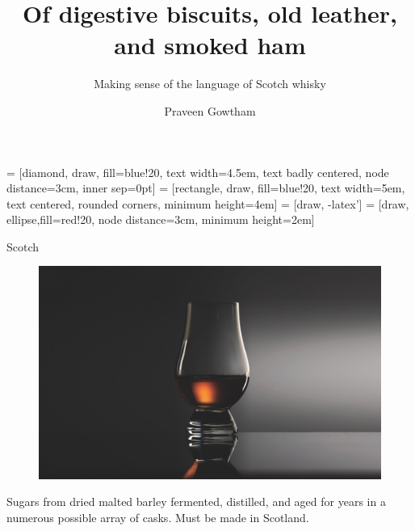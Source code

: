 \documentclass{beamer}
\title[Springboard Capstone 3]{Of digestive biscuits, old leather, and smoked ham}
\subtitle{Making sense of the language of Scotch whisky}
\author{Praveen Gowtham} %
\institute[UCLA] %
\date{} %
\begin{document}
 = [diamond, draw, fill=blue!20, 
text width=4.5em, text badly centered, node distance=3cm, inner sep=0pt]
 = [rectangle, draw, fill=blue!20, 
text width=5em, text centered, rounded corners, minimum height=4em]
 = [draw, -latex']
 = [draw, ellipse,fill=red!20, node distance=3cm,
minimum height=2em]
	
	\begin{frame}
		\titlepage %
	\end{frame}

	\begin{frame}{Scotch}

			\begin{figure}[H]
				\begin{center}
					\includegraphics[scale = 0.1]{gwlncairn}
				\end{center}
			
			\end{figure}
	Sugars from dried malted barley fermented, distilled, and aged for years in a numerous possible array of casks. Must be made in Scotland.


	\end{frame}
\end{document}
